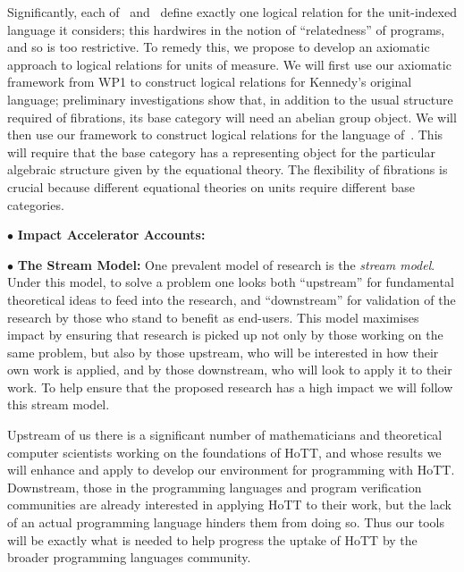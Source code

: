 \documentclass[a4paper,11pt]{article}
\begin{document}
Significantly, 
each of~\cite{ajk} and~\cite{ken97} define exactly one logical relation
for the unit-indexed language it considers; this hardwires in the
notion of ``relatedness'' of programs, and so is too restrictive. To
remedy this, we propose to develop an axiomatic approach to logical
relations for units of measure. We will first use our axiomatic
framework from WP1 to construct logical relations for Kennedy's
original language; preliminary investigations show that, in addition
to the usual structure required of fibrations, its base category will
need an abelian group object. We will then use our framework to
construct logical relations for the language of~\cite{ajk}. This will
require that the base category has a representing object for the
particular algebraic structure given by the equational theory. The
flexibility of fibrations is crucial because different equational
theories on units require different base categories.



\vspace*{0.02in}

$\bullet$ {\bf Impact Accelerator Accounts:} 

\vspace*{0.02in}


$\bullet$ {\bf The Stream Model:} One prevalent model of research is
the {\em stream model}. Under this model, to solve a problem one looks
both ``upstream'' for fundamental theoretical ideas to feed into the
research, and ``downstream'' for validation of the research by those
who stand to benefit as end-users. This model maximises impact by
ensuring that research is picked up not only by those working on the
same problem, but also by those upstream, who will be interested in
how their own work is applied, and by those downstream, who will look
to apply it to their work.  To help ensure that the proposed research
has a high impact we will follow this stream model.

Upstream of us there is a significant number of mathematicians and
theoretical computer scientists working on the foundations of HoTT,
and whose results we will enhance and apply to develop our environment
for programming with HoTT. Downstream, those in the programming
languages and program verification communities are already interested
in applying HoTT to their work, but the lack of an actual programming
language hinders them from doing so. Thus our tools will be exactly
what is needed to help progress the uptake of HoTT by the broader
programming languages community. 
\end{document}
